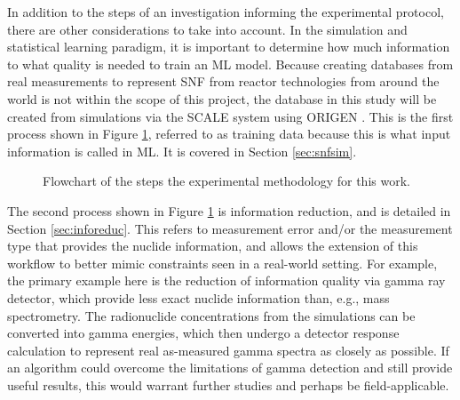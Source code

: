 In addition to the steps of an investigation informing the experimental
protocol, there are other considerations to take into account. In the
simulation and statistical learning paradigm, it is important to determine how
much information to what quality is needed to train an \gls{ML} model. Because
creating databases from real measurements to represent \gls{SNF} from reactor
technologies from around the world is not within the scope of this project, the
database in this study will be created from simulations via the \gls{SCALE}
\cite{scale} system using \gls{ORIGEN} \cite{origen}. This is the first process
shown in Figure \ref{fig:intromethod}, referred to as training data because
this is what input information is called in \gls{ML}. It is covered in Section
\ref{sec:snfsim}.

\begin{figure}[!hbt]
  \caption{Flowchart of the steps the experimental methodology for this work.}
  \label{fig:intromethod}
\end{figure}

The second process shown in Figure \ref{fig:intromethod} is information
reduction, and is detailed in Section \ref{sec:inforeduc}.  This refers to
measurement error and/or the measurement type that provides the nuclide
information, and allows the extension of this workflow to better mimic
constraints seen in a real-world setting.  For example, the primary example
here is the reduction of information quality via gamma ray detector, which
provide less exact nuclide information than, e.g., mass spectrometry.  The
radionuclide concentrations from the simulations can be converted into gamma
energies, which then undergo a detector response calculation to represent real
as-measured gamma spectra as closely as possible.  If an algorithm could
overcome the limitations of gamma detection and still provide useful results,
this would warrant further studies and perhaps be field-applicable.

